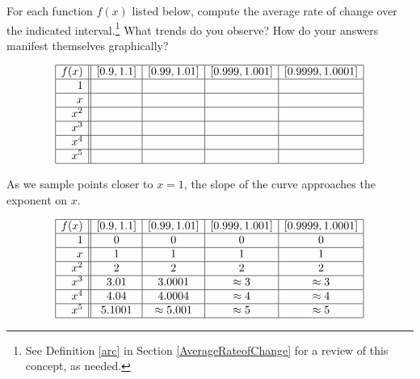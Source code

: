 \documentclass{ximera}
\begin{document}
\begin{problem}\label{monomialarcexercise}
    For each function $f(x)$ listed below, compute the average rate of change over the indicated interval.\footnote{See Definition \ref{arc} in Section \ref{AverageRateofChange} for a review of this concept, as needed.}  What trends do you observe?  How do your answers manifest themselves graphically?

\[ \begin{array}{|r||c|c|c|c|}  \hline

 f(x) &  [0.9, 1.1] & [0.99, 1.01] &[0.999, 1.001] & [0.9999, 1.0001]  \\ \hline
 1 &&&&   \\  \hline
 x &&&&    \\  \hline
 x^2 &&&&   \\  \hline
 x^3 &&&&   \\  \hline
 x^4 &&&&  \\ \hline
 x^5 &&&&  \\ \hline

\end{array} \]

\begin{solution}
As we sample points closer to $x=1$, the slope of the curve approaches the exponent on $x$.

\[ \begin{array}{|r||c|c|c|c|}  \hline

 f(x) &  [0.9, 1.1] & [0.99, 1.01] &[0.999, 1.001] & [0.9999, 1.0001]  \\ \hline
 1 &  0 &   0  & 0   & 0   \\  \hline
 x &  1 &   1  & 1   & 1   \\  \hline
 x^2 & 2 & 2 & 2 & 2  \\  \hline
 x^3 & 3.01  & 3.0001 & \approx 3 & \approx 3  \\  \hline
 x^4&  4.04 & 4.0004 & \approx 4 & \approx 4 \\ \hline
 x^5 & 5.1001 & \approx 5.001 & \approx 5 & \approx 5  \\ \hline

\end{array} \]
\end{solution}

\end{problem}
 
\end{document}
